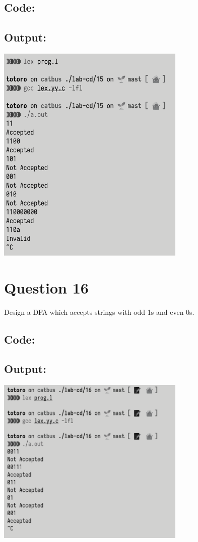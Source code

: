 \documentclass{article}
\begin{document}
\subsection*{Code:}

\newpage
\subsection*{Output:}
\begin{center}
  \includegraphics[width=9cm]{15/out.png}
\end{center}

\newpage
\section*{Question 16}
Design a DFA which accepts strings with odd 1s and even 0s.
\subsection*{Code:}

\newpage
\subsection*{Output:}
\begin{center}
  \includegraphics[width=9cm]{16/out.png}
\end{center}
\end{document}
